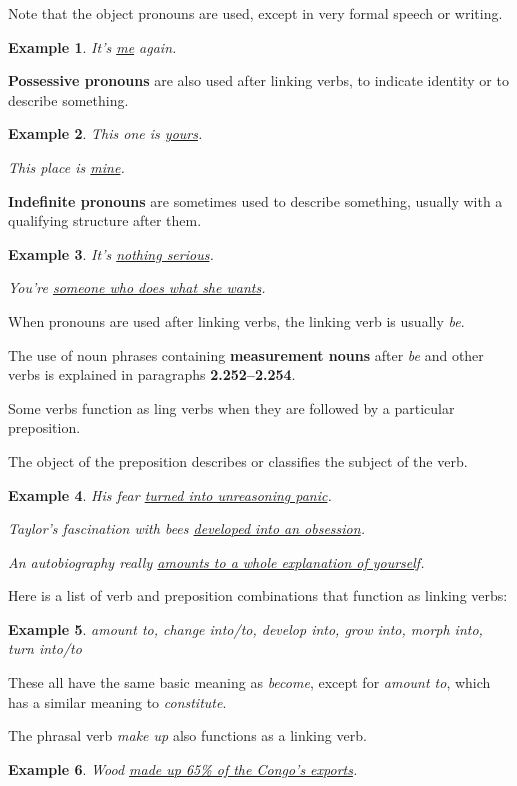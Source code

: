 \documentclass[oneside]{book}
\numberwithin{equation}{section}
\newtheorem{example}{Example}[section]
\begin{document}
Note that the object pronouns are used, except in very formal speech or writing.
\begin{example}
    It's \underline{me} again.
\end{example}
\textbf{Possessive pronouns} are also used after linking verbs, to indicate identity or to describe something.
\begin{example}
    This one is \underline{yours}.
    
    This place is \underline{mine}.
\end{example}
\textbf{Indefinite pronouns} are sometimes used to describe something, usually with a qualifying structure after them.
\begin{example}
    It's \underline{nothing serious}.
    
    You're \underline{someone who does what she wants}.
\end{example}
When pronouns are used after linking verbs, the linking verb is usually \textit{be}.

%
\noindent{} The use of noun phrases containing \textbf{measurement nouns} after \textit{be} and other verbs is explained in paragraphs \textbf{2.252--2.254}.

%
\noindent{} Some verbs function as ling verbs when they are followed by a particular preposition.

%
The object of the preposition describes or classifies the subject of the verb.
\begin{example}
    His fear \underline{turned into unreasoning panic}.
    
    Taylor's fascination with bees \underline{developed into an obsession}.
    
    An autobiography really \underline{amounts to a whole explanation of yourself}.
\end{example}
Here is a list of verb and preposition combinations that function as linking verbs:
\begin{example}
    amount to, change into/to, develop into, grow into, morph into, turn into/to
\end{example}
These all have the same basic meaning as \textit{become}, except for \textit{amount to}, which has a similar meaning to \textit{constitute}.

%
The phrasal verb \textit{make up} also functions as a linking verb.
\begin{example}
    Wood \underline{made up 65\% of the Congo's exports}.
\end{example}
\end{document}
